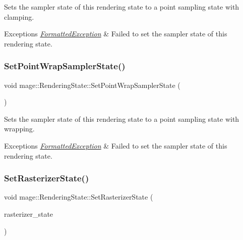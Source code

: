 Sets the sampler state of this rendering state to a point sampling state with clamping.


\begin{DoxyExceptions}{Exceptions}
{\em \hyperlink{structmage_1_1_formatted_exception}{Formatted\+Exception}} & Failed to set the sampler state of this rendering state. \\
\hline
\end{DoxyExceptions}
\hypertarget{structmage_1_1_rendering_state_ab8cebd05d1b01ec22f311aa0f1c1dc7e}{}\label{structmage_1_1_rendering_state_ab8cebd05d1b01ec22f311aa0f1c1dc7e} 
\subsubsection{\texorpdfstring{Set\+Point\+Wrap\+Sampler\+State()}{SetPointWrapSamplerState()}}
{\footnotesize\ttfamily void mage\+::\+Rendering\+State\+::\+Set\+Point\+Wrap\+Sampler\+State (\begin{DoxyParamCaption}{ }\end{DoxyParamCaption})}

Sets the sampler state of this rendering state to a point sampling state with wrapping.


\begin{DoxyExceptions}{Exceptions}
{\em \hyperlink{structmage_1_1_formatted_exception}{Formatted\+Exception}} & Failed to set the sampler state of this rendering state. \\
\hline
\end{DoxyExceptions}
\hypertarget{structmage_1_1_rendering_state_a44d2892e59966697e79b80eb0cd847f7}{}\label{structmage_1_1_rendering_state_a44d2892e59966697e79b80eb0cd847f7} 
\subsubsection{\texorpdfstring{Set\+Rasterizer\+State()}{SetRasterizerState()}}
{\footnotesize\ttfamily void mage\+::\+Rendering\+State\+::\+Set\+Rasterizer\+State (\begin{DoxyParamCaption}\item[{I\+D3\+D11\+Rasterizer\+State $\ast$}]{rasterizer\+\_\+state }\end{DoxyParamCaption})\hspace{0.3cm}{\ttfamily [noexcept]}}

